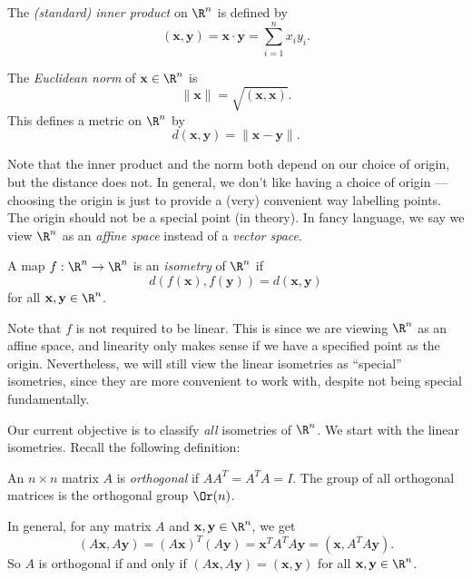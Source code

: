 \documentclass[a4paper]{article}
\begin{document}
\begin{defi}
  The \emph{(standard) inner product} on $\R^n$ is defined by
  \[
    (\mathbf{x}, \mathbf{y}) = \mathbf{x}\cdot \mathbf{y} = \sum_{i = 1}^n x_i y_i.
  \]
\end{defi}

\begin{defi}
  The \emph{Euclidean norm} of $\mathbf{x} \in \R^n$ is
  \[
    \|\mathbf{x}\| = \sqrt{(\mathbf{x}, \mathbf{x})}.
  \]
  This defines a metric on $\R^n$ by
  \[
    d(\mathbf{x}, \mathbf{y}) = \|\mathbf{x} - \mathbf{y}\|.
  \]
\end{defi}

Note that the inner product and the norm both depend on our choice of origin, but the distance does not. In general, we don't like having a choice of origin --- choosing the origin is just to provide a (very) convenient way labelling points. The origin should not be a special point (in theory). In fancy language, we say we view $\R^n$ as an \emph{affine space} instead of a \emph{vector space}.

\begin{defi}[Isometry]
  A map $f: \R^n \to \R^n$ is an \emph{isometry} of $\R^n$ if
  \[
    d(f(\mathbf{x}), f(\mathbf{y})) = d(\mathbf{x}, \mathbf{y})
  \]
  for all $\mathbf{x}, \mathbf{y} \in \R^n$.
\end{defi}
Note that $f$ is not required to be linear. This is since we are viewing $\R^n$ as an affine space, and linearity only makes sense if we have a specified point as the origin. Nevertheless, we will still view the linear isometries as ``special'' isometries, since they are more convenient to work with, despite not being special fundamentally.

Our current objective is to classify \emph{all} isometries of $\R^n$. We start with the linear isometries. Recall the following definition:
\begin{defi}
  An $n \times n$ matrix $A$ is \emph{orthogonal} if $AA^T = A^T A = I$. The group of all orthogonal matrices is the orthogonal group $\Or(n)$.
\end{defi}

In general, for any matrix $A$ and $\mathbf{x}, \mathbf{y} \in \R^n$, we get
\[
  (A\mathbf{x}, A \mathbf{y}) = (A\mathbf{x})^T (A \mathbf{y}) = \mathbf{x}^T A^T A \mathbf{y} = (\mathbf{x}, A^T A \mathbf{y}).
\]
So $A$ is orthogonal if and only if $(A\mathbf{x}, A\mathbf{y}) = (\mathbf{x}, \mathbf{y})$ for all $\mathbf{x}, \mathbf{y} \in \R^n$.
\end{document}
